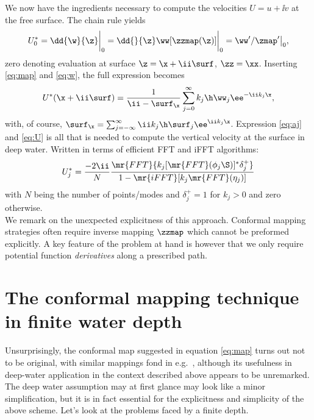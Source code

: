 We now have the ingredients necessary to compute the velocities $U=u+\ii v$ at the free surface. 
The chain rule yields
\begin{equation*}
U_0^* = \dd{\w}{\z}\bigg|_{0} = \dd{}{\z}\ww[\zzmap(\z)]\bigg|_0 = \ww'/\zmap' \big|_0,
\end{equation*}
zero denoting evaluation at surface $\z=\x+\ii\surf$, $\zz=\xx$.
Inserting \eqref{eq:map} and \eqref{eq:w}, the full expression becomes
\begin{equation}
U^*(\x+\ii\surf) = \frac{1}{\ii- \surf_{\x}}\sum_{j=0}^\infty  k_j \h\ww_j \ee^{-\ii k_j \x},
\label{eq:U}
\end{equation}
with, of course, $\surf_\x=\sum_{j=-\infty}^\infty\ii k_j\h\surf_j\ee^{\ii k_j \x}$.
Expression \eqref{eq:aj} and \eqref{eq:U} is all that is needed to compute the vertical velocity at the surface in deep water. Written in terms of efficient FFT and iFFT algorithms:
\begin{equation}
U_j^* = \frac{-2\ii}{N} \frac{  \mr{FFT}\{k_j [\mr{FFT}(\phi_j\S)]^* \delta_{j}^+\}}{ 1-\mr{iFFT}[k_j \mr{FFT}(\eta_j)]}
\end{equation}
with $N$ being the number of points/modes and $\delta_{j}^+=1$ for $k_j>0$ and zero otherwise.
\\

We remark on the unexpected explicitness of this approach. 
Conformal mapping strategies often require inverse mapping $\zzmap$ which cannot be preformed explicitly. 
A key feature of the problem at hand is however that we only require potential function \textit{derivatives} along a prescribed path.






\section{The conformal mapping technique in finite water depth}
\label{sec:finiteDepth}
Unsurprisingly, the conformal map suggested in equation \eqref{eq:map} turns out not to be original, with similar mappings fond in e.g.~\citet{chalikov2005modeling}, although its usefulness in deep-water application in the context described above appears to be unremarked.
The deep water assumption may at first glance may look like a minor simplification, but it is in fact essential for the explicitness and simplicity of the above scheme. 
Let's look at the problems faced by a finite depth.
\\

